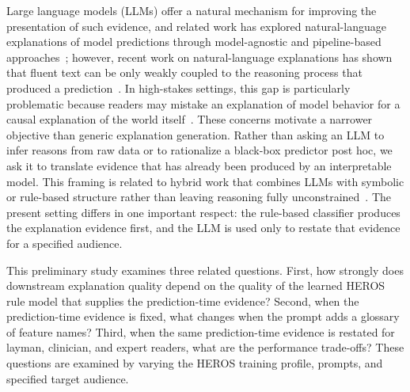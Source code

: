 \documentclass[sigconf]{acmart}
\begin{document}
Large language models (LLMs) offer a natural mechanism for improving the presentation of such evidence, and related work has explored natural-language explanations of model predictions through model-agnostic and pipeline-based approaches~\cite{menon2023mantle,wojciechowski2024faithful}; however, recent work on natural-language explanations has shown that fluent text can be only weakly coupled to the reasoning process that produced a prediction~\cite{atanasova2023faithfulness,parcalabescu2024measuring,lyu2024survey}. In high-stakes settings, this gap is particularly problematic because readers may mistake an explanation of model behavior for a causal explanation of the world itself~\cite{carriero2025describe}. These concerns motivate a narrower objective than generic explanation generation. Rather than asking an LLM to infer reasons from raw data or to rationalize a black-box predictor post hoc, we ask it to translate evidence that has already been produced by an interpretable model. This framing is related to hybrid work that combines LLMs with symbolic or rule-based structure rather than leaving reasoning fully unconstrained~\cite{xu2024symbcot,servantez2024chainlogic,wang2024symbolicwm}. The present setting differs in one important respect: the rule-based classifier produces the explanation evidence first, and the LLM is used only to restate that evidence for a specified audience.

This preliminary study examines three related questions. First, how strongly does downstream explanation quality depend on the quality of the learned HEROS rule model that supplies the prediction-time evidence? Second, when the prediction-time evidence is fixed, what changes when the prompt adds a glossary of feature names? Third, when the same prediction-time evidence is restated for layman, clinician, and expert readers, what are the performance trade-offs? These questions are examined by varying the HEROS training profile, prompts, and specified target audience. %
\end{document}
